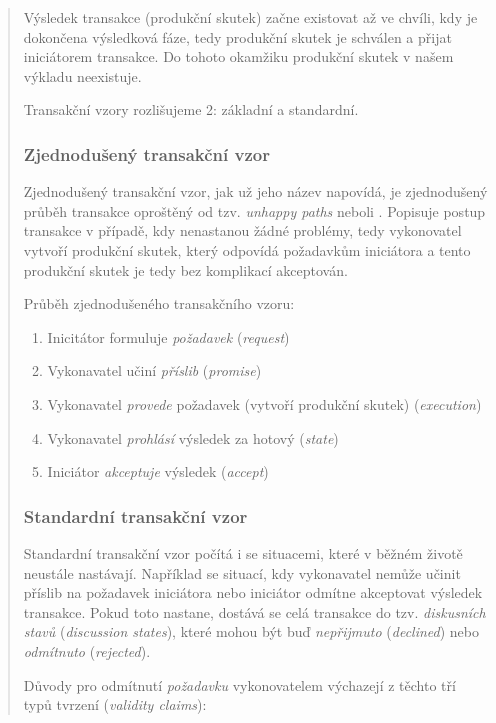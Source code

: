 \documentclass[]{article}
\begin{document}
\begin{quote}
Výsledek transakce (produkční skutek) začne existovat až ve chvíli, kdy je dokončena výsledková fáze, tedy produkční skutek je schválen a přijat iniciátorem transakce. Do tohoto okamžiku produkční skutek v našem výkladu neexistuje.

Transakční vzory rozlišujeme 2: základní a standardní.

\subsubsection{Zjednodušený transakční vzor}
Zjednodušený transakční vzor, jak už jeho název napovídá, je zjednodušený průběh transakce oproštěný od tzv. \textit{unhappy paths} neboli . Popisuje postup transakce v případě, kdy nenastanou žádné problémy, tedy vykonovatel vytvoří produkční skutek, který odpovídá požadavkům iniciátora a tento produkční skutek je tedy bez komplikací akceptován.

Průběh zjednodušeného transakčního vzoru:

\begin{enumerate}
\item Inicitátor formuluje \textit{požadavek} (\textit{request})
\item Vykonavatel učiní \textit{příslib} (\textit{promise})
\item Vykonavatel \textit{provede} požadavek (vytvoří produkční skutek) (\textit{execution})
\item Vykonavatel \textit{prohlásí} výsledek za hotový (\textit{state})
\item Iniciátor \textit{akceptuje} výsledek (\textit{accept})
\end{enumerate}


\subsubsection{Standardní transakční vzor}
Standardní transakční vzor počítá i se situacemi, které v běžném životě neustále nastávají. Například se situací, kdy vykonavatel nemůže učinit příslib na požadavek iniciátora nebo iniciátor odmítne akceptovat výsledek transakce. Pokud toto nastane, dostává se celá transakce do tzv. \textit{diskusních stavů} (\textit{discussion states}), které mohou být buď \textit{nepřijmuto} (\textit{declined}) nebo \textit{odmítnuto} (\textit{rejected}).

Důvody pro odmítnutí \textit{požadavku} vykonovatelem výchazejí z těchto tří typů tvrzení (\textit{validity claims}):


\end{quote}
\end{document}
